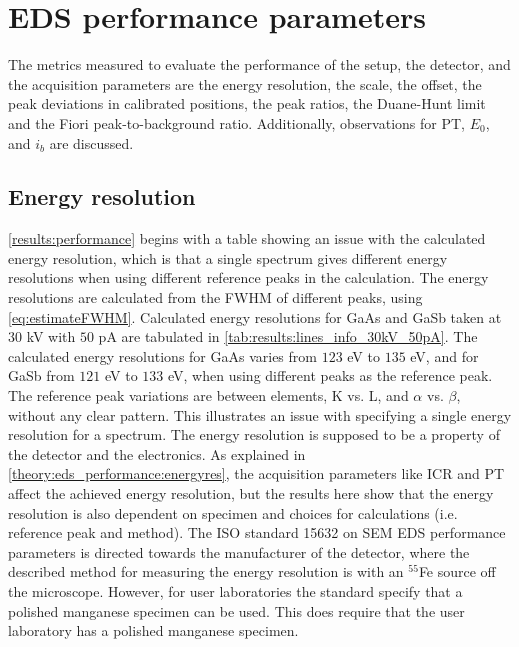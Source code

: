 \section{EDS performance parameters}
\label{discussion:performance}

The metrics measured to evaluate the performance of the setup, the detector, and the acquisition parameters are the energy resolution, the scale, the offset, the peak deviations in calibrated positions, the peak ratios, the Duane-Hunt limit and the Fiori peak-to-background ratio.
Additionally, observations for PT, $E_0$, and $i_b$ are discussed.



\subsection{Energy resolution}
\label{discussion:energy_resolution}


\cref{results:performance} begins with a table showing an issue with the calculated energy resolution, which is that a single spectrum gives different energy resolutions when using different reference peaks in the calculation.
The energy resolutions are calculated from the FWHM of different peaks, using \cref{eq:estimateFWHM}.
Calculated energy resolutions for GaAs and GaSb taken at $30$ kV with $50$ pA are tabulated in \cref{tab:results:lines_info_30kV_50pA}.
The calculated energy resolutions for GaAs varies from $123$ eV to $135$ eV, and for GaSb from $121$ eV to $133$ eV,  when using different peaks as the reference peak.
The reference peak variations are between elements, K vs. L, and $\alpha$ vs. $\beta$, without any clear pattern.
This illustrates an issue with specifying a single energy resolution for a spectrum.
The energy resolution is supposed to be a property of the detector and the electronics.
As explained in \cref{theory:eds_performance:energyres}, the acquisition parameters like ICR and PT affect the achieved energy resolution, but the results here show that the energy resolution is also dependent on specimen and choices for calculations (i.e. reference peak and method).
The ISO standard 15632 \cite{iso_qc_15632} on SEM EDS performance parameters is directed towards the manufacturer of the detector, where the described method for measuring the energy resolution is with an $^{55}$Fe source off the microscope.
However, for user laboratories the standard specify that a polished manganese specimen can be used.
This does require that the user laboratory has a polished manganese specimen. %


